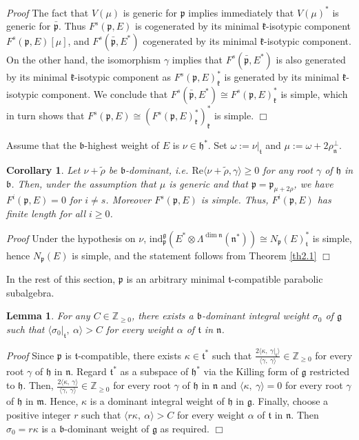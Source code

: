 \documentclass[11pt]{amsart}
\newcounter{theorem}
\newtheorem{lemma}[theo]{Lemma}
\newtheorem{corollary}[theo]{Corollary}
\renewenvironment{proof}{ \emph{Proof}}{$\Box$}
\renewcommand{\tt}{\mathfrak{t}}
\newcommand{\kk}{\mathfrak{k}}
\newcommand{\nn}{\mathfrak{n}}
\newcommand{\mm}{\mathfrak{m}}
\newcommand{\hh}{\mathfrak{h}}
\newcommand{\pp}{\mathfrak{p}}
\renewcommand{\gg}{\mathfrak{g}}
\newcommand{\bb}{\mathfrak{b}}
\newcommand{\refth}[1]{Theorem \ref{#1}}
\newcommand{\ind}{\mathrm{ind}}
\newcommand{\field}[1]{\mathbb{#1}}
\begin{document}
\begin{proof}
 The fact that $V(\mu)$ is generic for $\pp$ implies immediately that $V(\mu)^*$ is generic for $\bar{\pp}$. Thus $F^s(\pp,E)$ is cogenerated by its minimal $\kk$-isotypic component $F^s(\pp,E)[\mu]$, and $F^s(\bar{\pp},E^*)$ cogenerated by its minimal $\kk$-isotypic component. On the other hand, the isomorphism $\gamma$ implies that $F^s(\bar{\pp},E^*)$ is also generated by its minimal $\kk$-isotypic component as $F^s(\pp,E)^*_\kk$ is generated by its minimal $\kk$-isotypic component. We conclude that $F^s(\bar{\pp},E^*)\cong F^s(\pp,E)^*_\kk$ is simple, which in turn shows that $F^s(\pp,E)\cong(F^s(\pp,E)^*_\kk)^*_\kk$ is simple.
\end{proof}

Assume that the $\bb$-highest weight of $E$ is $\nu\in\hh^*$. Set $\omega:=\nu|_\tt$ and $\mu:=\omega+2\rho_{\nn}^{\perp}$.

\begin{corollary}\label{cor2.3}
Let $\nu+\tilde{\rho}$ be $\bb$-dominant, i.e. $\mathrm{Re}\langle\nu+\tilde{\rho},\gamma\rangle\geq 0$ for any root $\gamma$ of $\hh$ in $\bb$. Then, under the assumption that $\mu$ is generic and that $\pp=\pp_{\mu+2\rho}$, we have $F^i(\pp,E)=0$ for $i\neq s$. Moreover $F^s(\pp,E)$ is simple. Thus, $F^i(\pp,E)$ has finite length for all $i\geq 0$.
\end{corollary}
\begin{proof}
Under the hypothesis on $\nu$, $\ind_\pp^\gg(E^*\otimes\Lambda^{\dim\nn}(\nn^*))\cong N_\pp(E)_\tt^*$ is simple, hence $N_\pp(E)$ is simple, and the statement follows from \refth{th2.1}
\end{proof}

In the rest of this section, $\pp$ is an arbitrary minimal $\tt$-compatible parabolic subalgebra.
\begin{lemma}\label{le2.4}
For any $C\in\field{Z}_{\geq 0}$, there exists a $\bb$-dominant integral weight $\sigma_{0}$ of $\gg$ such that $\langle\sigma_{0}|_\tt,\ \alpha\rangle > C$ for every weight $\alpha$ of $\tt$ in $\nn$.
\end{lemma}
\begin{proof}
Since $\pp$ is $\tt$-compatible, there exists $\kappa\in\tt^*$ such that $\frac{2\langle\kappa,\ \gamma|_\tt\rangle}{\langle\gamma,\ \gamma\rangle}\in\field{Z}_{\geq 0}$ for every root $\gamma$ of $\hh$ in $\nn$. Regard $\tt^*$ as a subspace of $\hh^*$ via the Killing form of $\gg$ restricted to $\hh$. Then, $\frac{2\langle\kappa,\ \gamma\rangle}{\langle\gamma,\ \gamma\rangle}\in\field{Z}_{\geq 0}$ for every root $\gamma$ of $\hh$ in $\nn$ and $\langle\kappa,\ \gamma\rangle=0$ for every root $\gamma$ of $\hh$ in $\mm$. Hence, $\kappa$ is a dominant integral weight of $\hh$ in $\gg$. Finally, choose a positive integer $r$ such that $\langle r\kappa,\ \alpha\rangle > C$ for every weight $\alpha$ of $\tt$ in $\nn$. Then $\sigma_{0}=r\kappa$ is a $\bb$-dominant weight of $\gg$ as required.
\end{proof}
\end{document}
